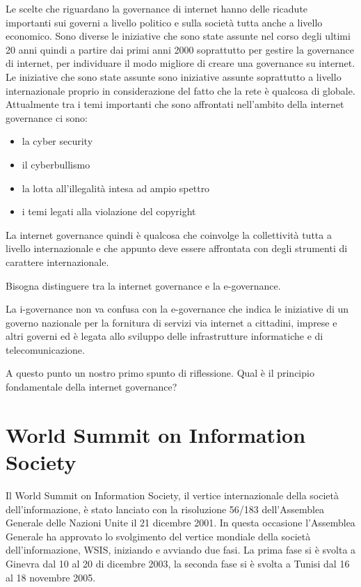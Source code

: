 Le scelte che riguardano la governance di internet hanno delle ricadute importanti sui governi a livello politico e sulla società tutta anche a livello economico. Sono diverse le iniziative che sono state assunte nel corso degli ultimi 20 anni quindi a partire dai primi anni 2000 soprattutto per gestire la governance di internet, per individuare il modo migliore di creare una governance su internet. Le iniziative che sono state assunte sono iniziative assunte soprattutto a livello internazionale proprio in considerazione del fatto che la rete è qualcosa di globale. Attualmente tra i temi importanti che sono affrontati nell'ambito della internet governance ci sono:
 
\begin{itemize}
    \item la cyber security
    \item il cyberbullismo
    \item la lotta all'illegalità intesa ad ampio spettro
    \item i temi legati alla violazione del copyright
\end{itemize}

La internet governance quindi è qualcosa che coinvolge la collettività tutta a livello internazionale e che appunto deve essere affrontata con degli strumenti di carattere internazionale.

Bisogna distinguere tra la internet governance e la e-governance.\par

La i-governance non  va  confusa con la e-governance che indica le iniziative di un governo nazionale per la fornitura di servizi via internet a cittadini, imprese e altri governi ed è legata allo sviluppo delle infrastrutture informatiche e di telecomunicazione.

A questo punto un nostro primo spunto di riflessione. Qual è il principio fondamentale della internet governance?

\section{World Summit on Information Society}
Il World Summit on Information Society, il vertice internazionale della società dell'informazione, è stato lanciato con la risoluzione 56/183 dell'Assemblea Generale delle Nazioni Unite il 21 dicembre 2001. In questa occasione l'Assemblea Generale ha approvato lo svolgimento del vertice mondiale della società dell'informazione, WSIS, iniziando e avviando due fasi. La prima fase si è svolta a Ginevra dal 10 al 20 di dicembre 2003, la seconda fase si è svolta a Tunisi dal 16 al 18 novembre 2005.

